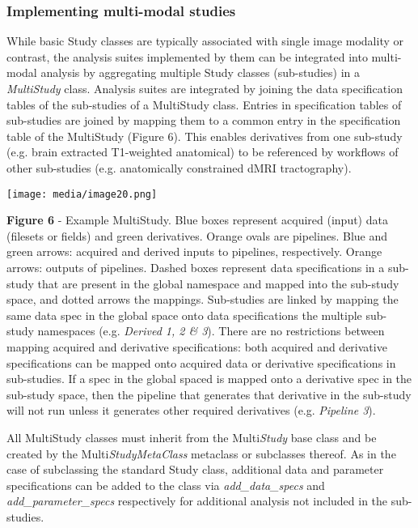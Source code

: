\hypertarget{implementing-multi-modal-studies}{%
\subsubsection{Implementing multi-modal
studies}\label{implementing-multi-modal-studies}}

While basic Study classes are typically associated with single image
modality or contrast, the analysis suites implemented by them can be
integrated into multi-modal analysis by aggregating multiple Study
classes (sub-studies) in a \emph{MultiStudy} class. Analysis suites are
integrated by joining the data specification tables of the sub-studies
of a MultiStudy class. Entries in specification tables of sub-studies
are joined by mapping them to a common entry in the specification table
of the MultiStudy (Figure 6). This enables derivatives from one
sub-study (e.g. brain extracted T1-weighted anatomical) to be referenced
by workflows of other sub-studies (e.g. anatomically constrained dMRI
tractography).

\texttt{[image: media/image20.png]}

\textbf{Figure 6} - Example MultiStudy. Blue boxes represent acquired
(input) data (filesets or fields) and green derivatives. Orange ovals
are pipelines. Blue and green arrows: acquired and derived inputs to
pipelines, respectively. Orange arrows: outputs of pipelines. Dashed
boxes represent data specifications in a sub-study that are present in
the global namespace and mapped into the sub-study space, and dotted
arrows the mappings. Sub-studies are linked by mapping the same data
spec in the global space onto data specifications the multiple sub-study
namespaces (e.g. \emph{Derived 1, 2 \& 3}). There are no restrictions
between mapping acquired and derivative specifications: both acquired
and derivative specifications can be mapped onto acquired data or
derivative specifications in sub-studies. If a spec in the global spaced
is mapped onto a derivative spec in the sub-study space, then the
pipeline that generates that derivative in the sub-study will not run
unless it generates other required derivatives (e.g. \emph{Pipeline 3}).

All MultiStudy classes must inherit from the Multi\emph{Study} base
class and be created by the Multi\emph{StudyMetaClass} metaclass or
subclasses thereof. As in the case of subclassing the standard Study
class, additional data and parameter specifications can be added to the
class via \emph{add\_data\_specs} and \emph{add\_parameter\_specs}
respectively for additional analysis not included in the sub-studies.

